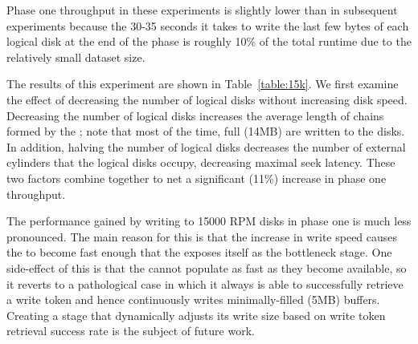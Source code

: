 Phase one throughput in these experiments is slightly lower than in subsequent
experiments because the 30-35 seconds it takes to write the last few bytes of
each logical disk at the end of the phase is roughly 10\% of the total runtime
due to the relatively small dataset size.

\begin{table}
\centering
\caption{\label{table:15k}Effect of increasing speed of intermediate disks
  on a two node, 500GB sort.}
\end{table}

The results of this experiment are shown in Table~\ref{table:15k}.  We first
examine the effect of decreasing the number of logical disks without increasing
disk speed. Decreasing the number of logical disks increases the average length
of \ldbuffer chains formed by the \ldts; note that most of the time, full
\writerbuffers (14MB) are written to the disks. In addition, halving the number
of logical disks decreases the number of external cylinders that the logical
disks occupy, decreasing maximal seek latency. These two factors combine
together to net a significant (11\%) increase in phase one throughput.

The performance gained by writing to 15000 RPM disks in phase one is much less
pronounced. The main reason for this is that the increase in write speed causes
the \writers to become fast enough that the \ldts exposes itself as the
bottleneck stage. One side-effect of this is that the
\ldts cannot populate \writerbuffers as fast as they become available, so it
reverts to a pathological case in which it always is able to successfully
retrieve a write token and hence continuously writes minimally-filled (5MB)
buffers. Creating a \ldts stage that dynamically adjusts its write size based
on write token retrieval success rate is the subject of future work.


